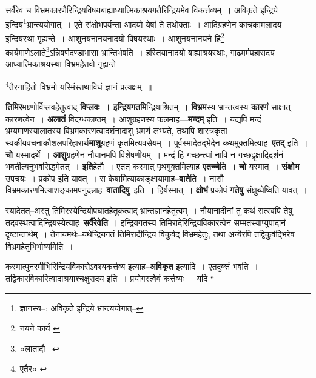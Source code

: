 \documentclass[article,12pt,a4paper]{memoir}
\begin{document}
	  \pstart सर्वैरेव च विभ्रमकारणैरिन्द्रियविषयबाह्याध्यात्मिकाश्रयगतैरिन्द्रियमेव विकर्त्तव्यम् । अविकृते इन्द्रिये इन्द्रिय\footnote{ज्ञानस्य--\cite{dp-msD-n}; अविकृते इन्द्रिये भ्रान्त्ययोगात्--\cite{dp-msB}}\-भ्रान्त्ययोगात् । एते संक्षोभपर्यन्ता आदयो येषां ते तथोक्ताः । आदिग्रहणेन काचकामलादय इन्द्रियस्था गृह्यन्ते । आशुनयनानयनादयो विषयस्थाः । आशुनयनानयने हि\footnote{नयने कार्य \cite{dp-msB} \cite{dp-msD} \cite{dp-edN}} कार्यमाणेऽलाते\footnote{०लातादौ--\cite{dp-msA} \cite{dp-edP} \cite{dp-edH} \cite{dp-edN}}\-ऽन्निवर्णदण्डाभासा भ्रान्तिर्भवति । हस्तियानादयो बाह्याश्रयस्थाः, गाढमर्मप्रहारादय आध्यात्मिकाश्रयस्था विभ्रमहेतवो गृह्यन्ते ।
	\pend
       

	  \pstart \footnote{एतैर० \cite{dp-msB} \cite{dp-msD}}\-तैरनाहितो विभ्रमो यस्मिंस्तथाविधं ज्ञानं प्रत्यक्षम् ॥
	\pend
      
	  \endgroup
	

	  \pstart \textbf{तिमिर}मक्ष्णोर्विप्लवहेतुत्वाद् \textbf{विप्लवः । इन्द्रियगतमि}न्द्रियाश्रितम् । \textbf{विभ्रम}स्य भ्रान्तत्वस्य \textbf{कारणं} साक्षात् कारणत्वेन । \textbf{अलातं} विदग्धकाष्ठम् । आशुग्रहणस्य फलमाह—\textbf{मन्दम्} इति । यद्यपि मन्दं भ्रम्यमाणस्यालातस्य विभ्रमकारणत्वादर्शनादाशु भ्रमणं लभ्यते, तथापि शास्त्रकृता स्वकीयवचनाकौशलपरिहारार्थ\textbf{माशु}ग्रहणं कृतमित्यवसेयम् । पूर्वस्मादेतद्भेदेन कथमुक्तमित्याह--\textbf{एतद्} इति । \textbf{चो} यस्मादर्थे । \textbf{आशु}ग्रहणेन नौयानमपि विशेषणीयम् । मन्दं हि गच्छन्त्यां नावि न गच्छद्वृक्षादिदर्शनं भवतीत्यनुभवसिद्धमेतत् । \textbf{इति}र्हेतौ । एतत् कस्मात् पृथगुक्तमित्याह \textbf{एतच्चे}ति । \textbf{चो} यस्मात् । \textbf{संक्षोभ} उपचयः । प्रकोप इति यावत् । स केषामित्याकाङ्क्षायामाह--\textbf{वाते}ति । नासौ विभ्रमकारणमित्याशङ्कामपनुदन्नाह--\textbf{वातादिषु}--इति । हिर्यस्मात् । \textbf{क्षोभं} प्रकोपं \textbf{गतेषु} संक्षुब्धेष्विति यावत् ।
	\pend
      

	  \pstart स्यादेतत्--अस्तु तिमिरस्येन्द्रियोपघातहेतुकत्वाद् भ्रान्तज्ञानहेतुत्वम् । नौयानादीनां तु कथं सत्स्वपि तेषु तदवस्थत्वादिन्द्रियस्येत्याह--\textbf{सर्वैरेवेति} । इन्द्रियगतस्य तिमिरादेरिन्द्रियविकारत्वेन सम्मतस्याप्युपादानं दृष्टान्तार्थम् । तेनायमर्थः--यथेन्द्रियगतं तिमिरादीन्द्रिय विकुर्वद् विभ्रमहेतुः, तथा अन्यैरपि तद्विकुर्वद्भिरेव विभ्रमहेतुभिर्भाव्यमिति ।
	\pend
      

	  \pstart कस्मात्पुनरमीभिरिन्द्रियविकारोऽवश्यकर्त्तव्य इत्याह--\textbf{अविकृत} इत्यादि । एतदुक्तं भवति । तद्विकारविकारित्वादाश्रयाश्चक्षुरादय इति । प्रयोग\leavevmode{}स्त्वेवं कर्त्तव्यः । यदि  \leavevmode{} “
	  
\end{document}
